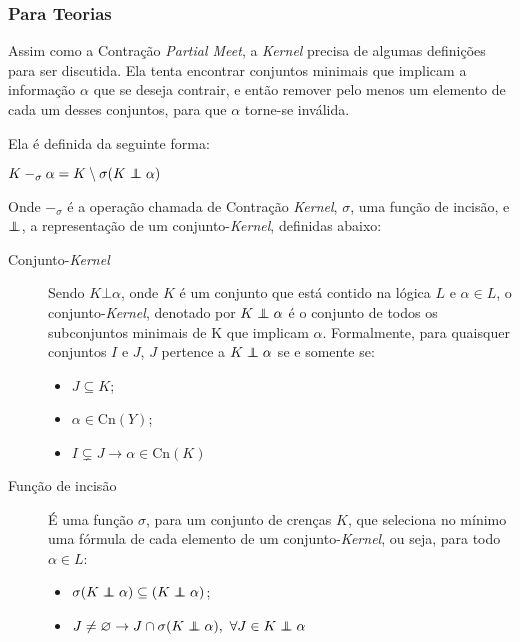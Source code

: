 \subsubsection{Para Teorias}

Assim como a Contração \textit{Partial Meet}, a \textit{Kernel} precisa de algumas definições para ser discutida. Ela tenta encontrar conjuntos minimais que implicam a informação $ \alpha $ que se deseja contrair, e então remover pelo menos um elemento de cada um desses conjuntos, para que $ \alpha $ torne-se inválida. 

Ela é definida da seguinte forma:

\begin{center}
	$ K -_{\sigma} \alpha = K \setminus \sigma(K \kcont \alpha) $
\end{center}

Onde $ -_{\sigma} $ é a operação chamada de Contração \textit{Kernel}, $ \sigma $, uma função de incisão, e $ \kcont $, a representação de um conjunto-\textit{Kernel}, definidas abaixo:

\begin{description}
	\item[Conjunto-\textit{Kernel}] Sendo $ K \bot \alpha $, onde $ K $ é um conjunto que está contido na lógica $ L $ e $ \alpha \in L $, o conjunto-\textit{Kernel}, denotado por $ K \kcont \alpha $ é o conjunto de todos os subconjuntos minimais de K que implicam $ \alpha $. Formalmente, para quaisquer conjuntos $ I $ e $ J $, $ J $ pertence a $ K \kcont \alpha $ se e somente se:
	\begin{itemize}
		\item $ J \subseteq K $;
		\item $ \alpha \in \text{Cn}(Y) $;
		\item $ I \subsetneq J \to \alpha \in \text{Cn}(K) $
	\end{itemize} 	
	\item[Função de incisão] É uma função $ \sigma $, para um conjunto de crenças $ K $, que seleciona no mínimo uma fórmula de cada elemento de um conjunto-\textit{Kernel}, ou seja, para todo $ \alpha \in L $:
	\begin{itemize}
		\item $ \sigma (K \kcont \alpha) \subseteq (K \kcont \alpha) $;
		\item $ J \neq \varnothing \to J \cap \sigma(K \kcont \alpha),\text{ } \forall J \in K \kcont \alpha $
	\end{itemize}
\end{description}

